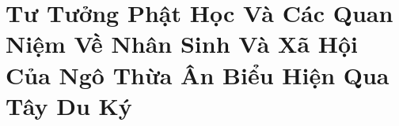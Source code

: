 \part{Tư Tưởng Phật Học Và Các Quan Niệm Về Nhân Sinh Và Xã Hội Của Ngô Thừa Ân Biểu Hiện Qua Tây Du Ký} %
\label{prt:ban_tung_hoi_truyen}

\afterpage{\blankpage}
\addtocounter{page}{+1}
